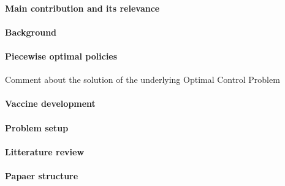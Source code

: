 \paragraph{Main contribution and its relevance}
\paragraph{Background}
\paragraph{Piecewise optimal policies}
    Comment about the solution of the underlying Optimal Control Problem
\paragraph{Vaccine development}
\paragraph{Problem setup}
\paragraph{Litterature review}
\paragraph{Papaer structure}